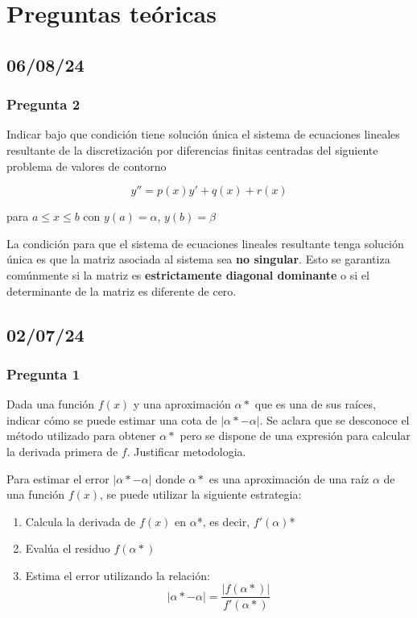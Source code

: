 \section{Preguntas teóricas}
\subsection{06/08/24}
\subsubsection{Pregunta 2}
Indicar bajo que condición tiene solución única el sistema de ecuaciones lineales resultante de la discretización por diferencias finitas centradas del siguiente problema de valores de contorno

$$y'' = p(x)y' + q(x) + r(x) $$

para $a \leq x \leq b$ con $y(a) = \alpha$, $y(b) = \beta$

La condición para que el sistema de ecuaciones lineales resultante tenga solución única es que la matriz asociada al sistema sea \textbf{no singular}. Esto se garantiza comúnmente si la matriz es \textbf{estrictamente diagonal dominante} o si el determinante de la matriz es diferente de cero.


\subsection{02/07/24}
\subsubsection{Pregunta 1}
Dada una función $f(x)$ y una aproximación $\alpha*$ que es una de sus raíces, indicar cómo se puede estimar una cota de $| \alpha* - \alpha |$. Se aclara que se desconoce el método utilizado para obtener $\alpha*$ pero se dispone de una expresión para calcular la derivada primera de $f$. Justificar metodologia.

Para estimar el error  $| \alpha* - \alpha |$ donde $\alpha*$ es una aproximación de una raíz $\alpha$ de una función $f(x)$, se puede utilizar la siguiente estrategia:

\begin{enumerate}
    \item {Calcula la derivada de $f(x)$ en $\alpha$*, es decir, $f'(\alpha)$*}
    \item {Evalúa el residuo $f(\alpha*)$}
    \item {Estima el error utilizando la relación: 
    $$ | \alpha* - \alpha |  = \frac{|f(\alpha*)|}{f'(\alpha*)}$$}
\end{enumerate}

